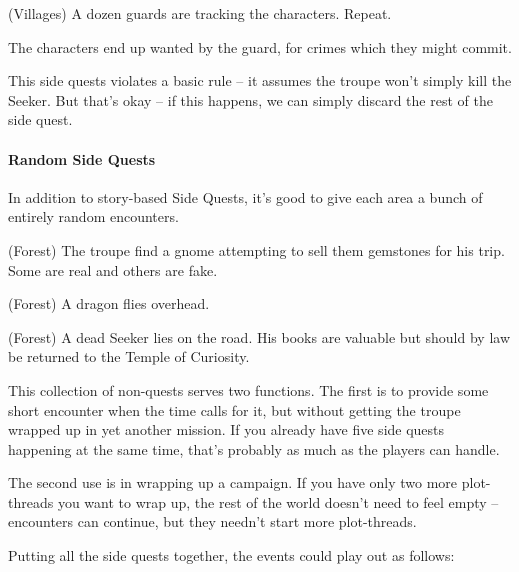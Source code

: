 \begin{multicols}{2}
\begin{exampletext}
\begin{list}{\sqn}{}
  \item
  (Villages) A dozen guards are tracking the characters. Repeat.

\end{list}

The characters end up wanted by the \gls{guard}, for crimes which they might commit.

\end{exampletext}

This side quests violates a basic rule -- it assumes the troupe won't simply kill the Seeker.
But that's okay  -- if this happens, we can simply discard the rest of the side quest.

\paragraph{Random Side Quests}

In addition to story-based Side Quests, it's good to give each area a bunch of entirely random encounters.

\begin{list}{\sqn}{}

  \item{(Forest) The troupe find a gnome attempting to sell them gemstones for his trip. Some are real and others are fake.}

  \item{(Forest) A dragon flies overhead.}

  \item
  (Forest) A dead Seeker lies on the road.
  His books are valuable but should by law be returned to the Temple of Curiosity.

\end{list}

\noindent
This collection of non-quests serves two functions.
The first is to provide some short encounter when the time calls for it, but without getting the troupe wrapped up in yet another mission.
If you already have five side quests happening at the same time, that's probably as much as the players can handle.

The second use is in wrapping up a campaign.
If you have only two more plot-threads you want to wrap up, the rest of the world doesn't need to feel empty -- encounters can continue, but they needn't start more plot-threads.

Putting all the side quests together, the events could play out as follows:


\end{multicols}
